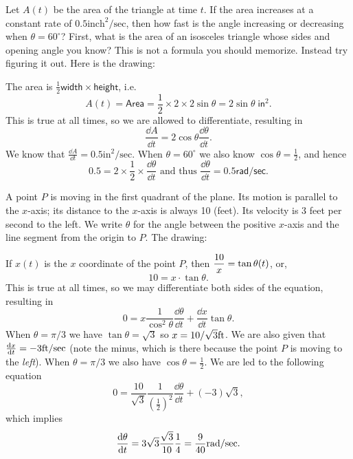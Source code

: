 \begin{multicols}{2}
Let $A(t)$ be the area of the triangle at time $t$.  If the area increases at
a constant rate of $0.5\text{inch}^2/\text{sec}$, then how fast is the angle
increasing or decreasing when $\theta=60^\circ$?
\answer 
First, what is the area of an isosceles triangle whose sides and opening
angle you know?  This is not a formula you should memorize.  Instead try
figuring it out.  Here is the drawing:
\begin{center}
  
\end{center}
The area is $\frac12 \mathsf{width}\times\mathsf{height}$, i.e.
\[
A(t)
= \mathsf{Area}
= \frac12 \times 2 \times2\sin\theta
= 2\sin\theta \; \mathsf{in}^2.
\]
This is true at all times, so we are allowed to differentiate, resulting in
\[
\frac{\dd A} {\dd t} = 2\cos \theta \frac{\dd \theta} {\dd t}.
\]
We know that $\frac{\dd A} {\dd t} = 0.5 \text{in}^2/\text{sec}$.
When $\theta=60^\circ$ we also know $\cos \theta = \frac{1} {2}$, and hence
\[
0.5 = 2\times\frac{1} {2} \times \frac{\dd \theta} {\dd t}
\text{ and thus }
\frac{\dd \theta} {\dd t} = 0.5 \mathsf{rad}/\mathsf{sec}.
\]
\endanswer




\problem A point $P$ is moving in the first quadrant of the plane.  Its motion 
is parallel to the $x$-axis; its distance to the $x$-axis is always 10 (feet).
Its velocity is 3 feet per second to the left.  We write $\theta$ for the
angle between the positive $x$-axis and the line segment from the origin to
$P$.
\answer 
The drawing:
\begin{center}
  
\end{center}
If $x(t)$ is the $x$ coordinate of the point $P$, then
$\displaystyle \frac{10} {x} = \tan \theta(t)$, or,
\[
10 = x\cdot \tan \theta.
\]
This is true at all times, so we may differentiate both sides
of the equation, resulting in
\[
0 = x \frac{1} {\cos^2\theta}\frac{\dd\theta} {\dd t} + \frac{\dd x} {\dd t}\tan \theta.
\]
When $\theta=\pi/3$ we have $\tan\theta = \sqrt{3}$ so $x=10/\sqrt{3}{\rm ft}$.
We are also given that $\frac{\mathrm{d} x} {\mathrm{d} t} = -3 {\rm ft}/{\rm sec}$
(note the minus, which
is there because the point $P$ is moving to the \emph{left}).
When $\theta=\pi/3$ we also have $\cos \theta = \frac12$.
We are led to the following equation
\[
0 = \frac{10} {\sqrt{3}} \frac{1} {(\frac12)^2} \frac{\dd \theta} {\dd t}
+ (-3) \sqrt{3},
\]
which implies
\[
 \frac{\mathrm{d} \theta} {\mathrm{d} t}
= 3\sqrt{3} \frac{\sqrt{3}} {10} \frac{1} {4}
= \frac{9} {40} {\rm rad}/{\rm sec}.
\]









\end{multicols}
